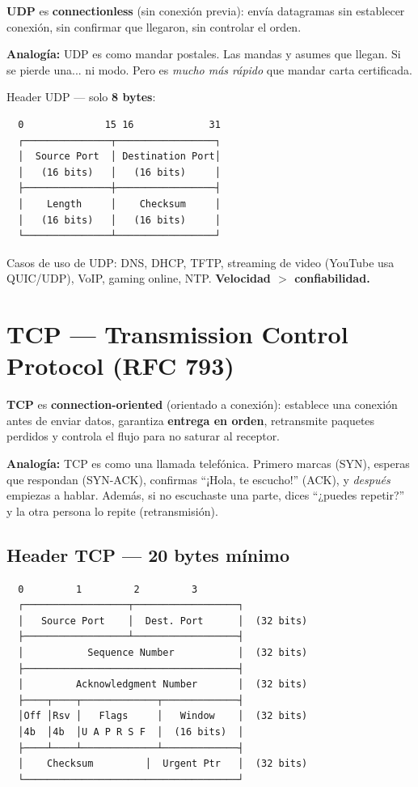 \begin{concepto}
\textbf{UDP} es \textbf{connectionless} (sin conexión previa): envía datagramas
sin establecer conexión, sin confirmar que llegaron, sin controlar el orden.

 \textbf{Analogía:} UDP es como mandar postales.
Las mandas y asumes que llegan. Si se pierde una... ni modo.
Pero es \textit{mucho más rápido} que mandar carta certificada.
\end{concepto}

Header UDP --- solo \textbf{8 bytes}:

\begin{lstlisting}
  0              15 16             31
  ┌───────────────┬─────────────────┐
  │  Source Port  │ Destination Port│
  │   (16 bits)   │   (16 bits)     │
  ├───────────────┼─────────────────┤
  │    Length     │    Checksum     │
  │   (16 bits)   │   (16 bits)     │
  └───────────────┴─────────────────┘
\end{lstlisting}

Casos de uso de UDP: DNS, DHCP, TFTP, streaming de video (YouTube usa QUIC/UDP),
VoIP, gaming online, NTP. \textbf{Velocidad $>$ confiabilidad.}

\section{ TCP --- Transmission Control Protocol (RFC 793)}

\begin{concepto}
\textbf{TCP} es \textbf{connection-oriented} (orientado a conexión):
establece una conexión antes de enviar datos, garantiza \textbf{entrega en orden},
retransmite paquetes perdidos y controla el flujo para no saturar al receptor.

 \textbf{Analogía:} TCP es como una llamada telefónica.
Primero marcas (SYN), esperas que respondan (SYN-ACK), confirmas
``¡Hola, te escucho!'' (ACK), y \textit{después} empiezas a hablar.
Además, si no escuchaste una parte, dices ``¿puedes repetir?'' y la otra
persona lo repite (retransmisión).
\end{concepto}

\subsection{Header TCP --- 20 bytes mínimo}

\begin{lstlisting}
  0         1         2         3
  ┌──────────────────┬──────────────────┐
  │   Source Port    │  Dest. Port      │  (32 bits)
  ├──────────────────┴──────────────────┤
  │           Sequence Number           │  (32 bits)
  ├─────────────────────────────────────┤
  │         Acknowledgment Number       │  (32 bits)
  ├────┬────┬─────────────┬─────────────┤
  │Off │Rsv │   Flags     │   Window    │  (32 bits)
  │4b  │4b  │U A P R S F  │  (16 bits)  │
  ├────┴────┴─────────────┴─────────────┤
  │    Checksum         │  Urgent Ptr   │  (32 bits)
  └─────────────────────────────────────┘
\end{lstlisting}

